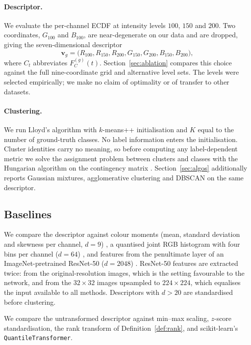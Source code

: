 \documentclass[pdflatex,sn-basic]{sn-jnl}
\theoremstyle{thmstyleone}%
\theoremstyle{thmstyletwo}%
\theoremstyle{thmstylethree}%
\begin{document}
\paragraph{Descriptor.} We evaluate the per-channel ECDF at intensity levels
$100$, $150$ and $200$. Two coordinates, $G_{100}$ and $B_{100}$, are
near-degenerate on our data and are dropped, giving the seven-dimensional
descriptor
\begin{equation}\label{eq:seven}
\mathbf{v}_g=\big(R_{100},R_{150},R_{200},G_{150},G_{200},B_{150},B_{200}\big),
\end{equation}
where $C_{t}$ abbreviates $F^{(g)}_C(t)$. Section~\ref{sec:ablation} compares
this choice against the full nine-coordinate grid and alternative level sets.
The levels were selected empirically; we make no claim of optimality or of
transfer to other datasets.

\paragraph{Clustering.} We run Lloyd's algorithm with $k$-means++
initialisation \cite{ref:arthur2007} and $K$ equal to the number of
ground-truth classes. No label information enters the initialisation. Cluster
identities carry no meaning, so before computing any label-dependent metric we
solve the assignment problem between clusters and classes with the Hungarian
algorithm on the contingency matrix \cite{ref:kuhn1955}.
Section~\ref{sec:algos} additionally reports Gaussian mixtures, agglomerative
clustering and DBSCAN on the same descriptor.

\subsection{Baselines}\label{sec:baselines}

We compare the descriptor against colour moments (mean, standard deviation and
skewness per channel, $d=9$) \cite{ref:stricker1995}, a quantised joint RGB
histogram with four bins per channel ($d=64$) \cite{ref:swain1991}, and
features from the penultimate layer of an ImageNet-pretrained ResNet-50
($d=2048$) \cite{ref:he2016resnet}. ResNet-50 features are extracted twice:
from the original-resolution images, which is the setting favourable to the
network, and from the $32\times32$ images upsampled to $224\times224$, which
equalises the input available to all methods. Descriptors with $d>20$ are
standardised before clustering.

We compare the untransformed descriptor against min--max scaling, $z$-score
standardisation, the rank transform of Definition~\ref{def:rank}, and
scikit-learn's \texttt{QuantileTransformer}.
\end{document}
